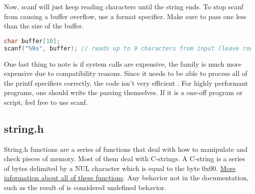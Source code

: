 Now, scanf will just keep reading characters until the string ends.
To stop scanf from causing a buffer overflow, use a format specifier.
Make sure to pass one less than the size of the buffer.

\begin{lstlisting}[language=C]
char buffer[10];
scanf("%9s", buffer); // reads up to 9 characters from input (leave room for the 10th byte to be the terminating byte)
\end{lstlisting}

One last thing to note is if system calls are expensive, the  family is much more expensive due to compatibility reasons.
Since it needs to be able to process all of the printf specifiers correctly, the code isn't very efficient .
For highly performant programs, one should write the parsing themselves.
If it is a one-off program or script, feel free to use scanf.

\subsection{string.h}

String.h functions are a series of functions that deal with how to manipulate and check pieces of memory.
Most of them deal with C-strings.
A C-string is a series of bytes delimited by a NUL character which is equal to the byte 0x00.
\href{https://linux.die.net/man/3/string}{More information about all of these functions}.
Any behavior not in the documentation, such as the result of  is considered undefined behavior.

